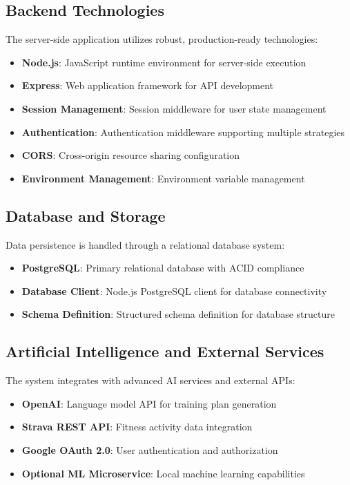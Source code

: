 \subsection{Backend Technologies}

The server-side application utilizes robust, production-ready technologies:

\begin{itemize}
    \item \textbf{Node.js}: JavaScript runtime environment for server-side execution
    \item \textbf{Express}: Web application framework for API development
    \item \textbf{Session Management}: Session middleware for user state management
    \item \textbf{Authentication}: Authentication middleware supporting multiple strategies
    \item \textbf{CORS}: Cross-origin resource sharing configuration
    \item \textbf{Environment Management}: Environment variable management
\end{itemize}

\subsection{Database and Storage}

Data persistence is handled through a relational database system:

\begin{itemize}
    \item \textbf{PostgreSQL}: Primary relational database with ACID compliance
    \item \textbf{Database Client}: Node.js PostgreSQL client for database connectivity
    \item \textbf{Schema Definition}: Structured schema definition for database structure
\end{itemize}

\subsection{Artificial Intelligence and External Services}

The system integrates with advanced AI services and external APIs:

\begin{itemize}
    \item \textbf{OpenAI}: Language model API for training plan generation
    \item \textbf{Strava REST API}: Fitness activity data integration
    \item \textbf{Google OAuth 2.0}: User authentication and authorization
    \item \textbf{Optional ML Microservice}: Local machine learning capabilities
\end{itemize}

